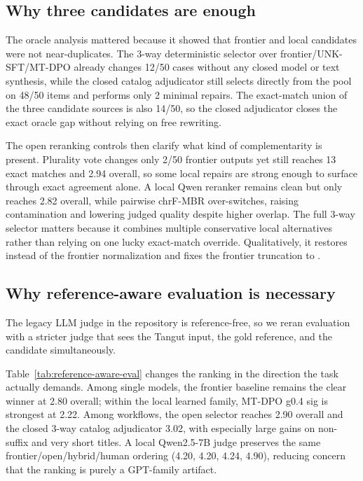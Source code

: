 

\subsection{Why three candidates are enough}

The oracle analysis mattered because it showed that frontier and local candidates were not near-duplicates. The 3-way deterministic selector over frontier/UNK-SFT/MT-DPO already changes 12/50 cases without any closed model or text synthesis, while the closed catalog adjudicator still selects directly from the pool on 48/50 items and performs only 2 minimal repairs. The exact-match union of the three candidate sources is also 14/50, so the closed adjudicator closes the exact oracle gap without relying on free rewriting.

The open reranking controls then clarify what kind of complementarity is present. Plurality vote changes only 2/50 frontier outputs yet still reaches 13 exact matches and 2.94 overall, so some local repairs are strong enough to surface through exact agreement alone. A local Qwen reranker remains clean but only reaches 2.82 overall, while pairwise chrF-MBR over-switches, raising contamination and lowering judged quality despite higher overlap. The full 3-way selector matters because it combines multiple conservative local alternatives rather than relying on one lucky exact-match override. Qualitatively, it restores  instead of the frontier normalization  and fixes the frontier truncation  to .

\subsection{Why reference-aware evaluation is necessary}

The legacy LLM judge in the repository is reference-free, so we reran evaluation with a stricter judge that sees the Tangut input, the gold reference, and the candidate simultaneously.



Table~\ref{tab:reference-aware-eval} changes the ranking in the direction the task actually demands. Among single models, the frontier baseline remains the clear winner at 2.80 overall; within the local learned family, MT-DPO g0.4 sig is strongest at 2.22. Among workflows, the open selector reaches 2.90 overall and the closed 3-way catalog adjudicator 3.02, with especially large gains on non-suffix and very short titles. A local Qwen2.5-7B judge preserves the same frontier/open/hybrid/human ordering (4.20, 4.20, 4.24, 4.90), reducing concern that the ranking is purely a GPT-family artifact.

